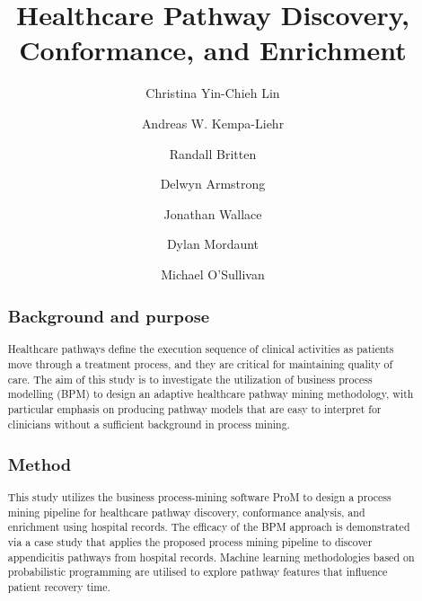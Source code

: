 \documentclass{elsarticle}
\newcommand{\wordcount}[2]{%
  (\immediate\write18{texcount -1 -sum -merge #1.tex > #1-words.sum }%
  /#2 words)%
}
\begin{document}
\newcommand{\plugin}[1]{\texttt{#1}}
\begin{frontmatter}

\title{Healthcare Pathway Discovery, Conformance, and Enrichment}


\author[mymainaddress]{Christina Yin-Chieh Lin}
\author[mymainaddress]{Andreas W. Kempa-Liehr}
\author[ADHB,Orion]{Randall Britten}
\author[Waitemata]{Delwyn Armstrong}
\author[Waitemata]{Jonathan Wallace}
\author[Adelaide,wasWaitemata]{Dylan Mordaunt}
\author[mymainaddress]{Michael O'Sullivan}

\address[mymainaddress]{Department of Engineering Science, The University of Auckland, 70 Symonds St, Auckland, New Zealand}
\address[ADHB]{Auckland District Health Board, 2 Park Road, Auckland, New Zealand}
\address[Orion]{was at Orion Health, 181 Grafton Rd, Auckland, New Zealand}

\address[Waitemata]{Waitemata District Health Board, 124 Shakespeare Rd, Auckland, New Zealand
}
\address[Adelaide]{University of Adelaide and Flinders University, Adelaide, Australia}
\address[wasWaitemata]{was at Waitemata District Health Board, 124 Shakespeare Rd, Auckland, New Zealand
}

\begin{abstract}
\subsection*{Background and purpose}
Healthcare pathways define the execution sequence of clinical activities as patients move through a treatment process, and they are critical for maintaining quality of care. The aim of this study is to investigate the utilization of business process modelling (BPM) to design an adaptive healthcare pathway mining methodology, with particular emphasis on producing pathway models that are easy to interpret for clinicians without a sufficient background in process mining.

\subsection*{Method}
This study utilizes the business process-mining software ProM to design a process mining pipeline for healthcare pathway discovery, conformance analysis, and enrichment using hospital records. The efficacy of the BPM approach is demonstrated via a case study that applies the proposed process mining pipeline to discover appendicitis pathways from hospital records. Machine learning methodologies based on probabilistic programming are utilised to explore pathway features that influence patient recovery time.


\end{abstract}
\end{frontmatter}
\end{document}
